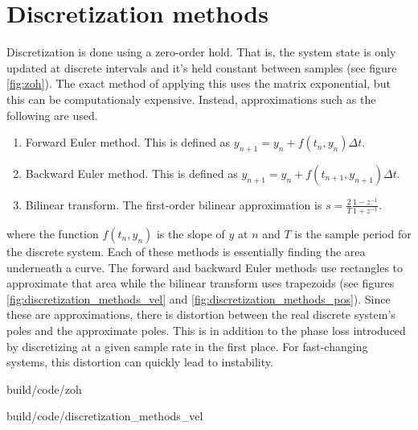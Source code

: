 \section{Discretization methods} \label{sec:discretization_methods}

Discretization is done using a zero-order hold. That is, the system state is
only updated at discrete intervals and it's held constant between samples (see
figure \ref{fig:zoh}). The exact method of applying this uses the matrix
exponential, but this can be computationaly expensive. Instead, approximations
such as the following are used.

\begin{enumerate}
  \item Forward Euler method. This is defined as
    $y_{n+1} = y_n + f(t_n, y_n) \Delta t$.
  \item Backward Euler method. This is defined as
    $y_{n+1} = y_n + f(t_{n+1}, y_{n+1}) \Delta t$.
  \item Bilinear transform. The first-order bilinear approximation is
    $s = \frac{2}{T} \frac{1 - z^{-1}}{1 + z^{-1}}$.
\end{enumerate}

where the function $f(t_n, y_n)$ is the slope of $y$ at $n$ and $T$ is the
sample period for the discrete system. Each of these methods is essentially
finding the area underneath a curve. The forward and backward Euler methods use
rectangles to approximate that area while the bilinear transform uses
trapezoids (see figures \ref{fig:discretization_methods_vel} and
\ref{fig:discretization_methods_pos}). Since these are approximations, there is
distortion between the real discrete system's poles and the approximate poles.
This is in addition to the phase loss introduced by discretizing at a given
sample rate in the first place. For fast-changing systems, this distortion can
quickly lead to instability.

\begin{svg}{build/code/zoh}
    \caption{Zero-order hold of a system response}
    \label{fig:zoh}
\end{svg}

\begin{svg}{build/code/discretization_methods_vel}
  \caption{Discretization methods applied to velocity data}
  \label{fig:discretization_methods_vel}
\end{svg}

